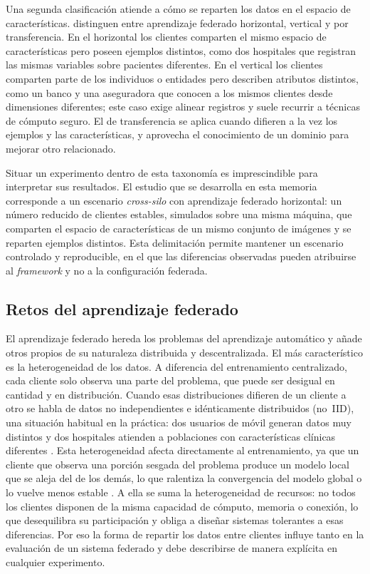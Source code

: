 Una segunda clasificación atiende a cómo se reparten los datos en el espacio de
características. \textcite{yang2019federated} distinguen entre aprendizaje federado
horizontal, vertical y por transferencia. En el horizontal los clientes comparten el
mismo espacio de características pero poseen ejemplos distintos, como dos hospitales que
registran las mismas variables sobre pacientes diferentes. En el vertical los clientes
comparten parte de los individuos o entidades pero describen atributos distintos, como un
banco y una aseguradora que conocen a los mismos clientes desde dimensiones diferentes;
este caso exige alinear registros y suele recurrir a técnicas de cómputo seguro. El de
transferencia se aplica cuando difieren a la vez los ejemplos y las características, y
aprovecha el conocimiento de un dominio para mejorar otro relacionado.

Situar un experimento dentro de esta taxonomía es imprescindible para interpretar sus
resultados. El estudio que se desarrolla en esta memoria corresponde a un escenario
\textit{cross-silo} con aprendizaje federado horizontal: un número reducido de clientes
estables, simulados sobre una misma máquina, que comparten el espacio de características
de un mismo conjunto de imágenes y se reparten ejemplos distintos. Esta delimitación
permite mantener un escenario controlado y reproducible, en el que las diferencias
observadas pueden atribuirse al \textit{framework} y no a la configuración federada.

\subsection{Retos del aprendizaje federado}\label{sec:retos}

El aprendizaje federado hereda los problemas del aprendizaje automático y añade otros
propios de su naturaleza distribuida y descentralizada. El más característico es la
heterogeneidad de los datos\label{sec:noiid}. A diferencia del entrenamiento
centralizado, cada cliente solo observa una parte del problema, que puede ser desigual en
cantidad y en distribución. Cuando esas distribuciones difieren de un cliente a otro se
habla de datos no independientes e idénticamente distribuidos (no~IID), una situación
habitual en la práctica: dos usuarios de móvil generan datos muy distintos y dos
hospitales atienden a poblaciones con características clínicas diferentes
\parencite{kairouz2021advances}. Esta heterogeneidad afecta directamente al
entrenamiento, ya que un cliente que observa una porción sesgada del problema produce un
modelo local que se aleja del de los demás, lo que ralentiza la convergencia del modelo
global o lo vuelve menos estable \parencite{li2020federated}. A ella se suma la
heterogeneidad de recursos: no todos los clientes disponen de la misma capacidad de
cómputo, memoria o conexión, lo que desequilibra su participación y obliga a diseñar
sistemas tolerantes a esas diferencias. Por eso la forma de repartir los datos entre
clientes influye tanto en la evaluación de un sistema federado y debe describirse de
manera explícita en cualquier experimento.

